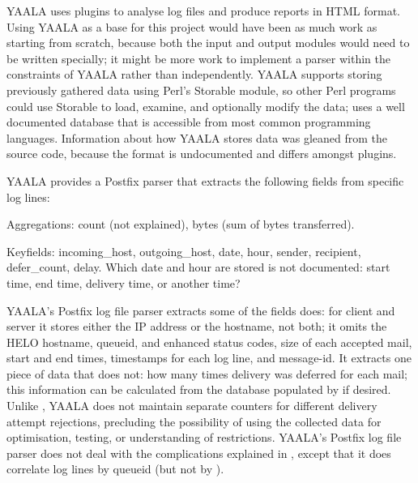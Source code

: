 YAALA uses plugins to analyse log files and produce reports in HTML format.
Using YAALA as a base for this project would have been as much work as
starting from scratch, because both the input and output modules would need
to be written specially; it might be more work to implement a parser within
the constraints of YAALA rather than independently.  YAALA supports storing
previously gathered data using Perl's Storable module, so other Perl
programs could use Storable to load, examine, and optionally modify the
data; \parsername{} uses a well documented database that is accessible from
most common programming languages.  Information about how YAALA stores data
was gleaned from the source code, because the format is undocumented and
differs amongst plugins.

YAALA provides a Postfix parser that extracts the following fields from
specific log lines:

\begin{boldeqlist}

    \item [Aggregations:] count (not explained), bytes (sum of bytes
        transferred).

    \item [Keyfields:] incoming\_host, outgoing\_host, date, hour, sender,
        recipient, defer\_count, delay.  Which date and hour are stored is
        not documented: start time, end time, delivery time, or another
        time?

\end{boldeqlist}

YAALA's Postfix log file parser extracts some of the fields \parsername{}
does: for client and server it stores either the IP address or the
hostname, not both; it omits the HELO hostname, queueid,  and
enhanced status codes, size of each accepted mail, start and end times,
timestamps for each log line, and message-id\@.  It extracts one piece of
data that \parsername{} does not: how many times delivery was deferred for
each mail; this information can be calculated from the database populated
by \parsername{} if desired.  Unlike \parsername{}, YAALA does not maintain
separate counters for different delivery attempt rejections, precluding the
possibility of using the collected data for optimisation, testing, or
understanding of restrictions.  YAALA's Postfix log file parser does not
deal with the complications explained in , except
that it does correlate log lines by queueid (but not by ).

